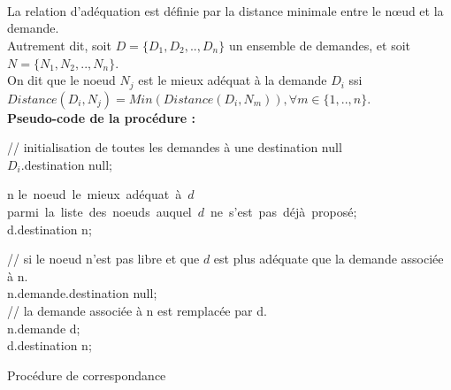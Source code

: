 \\ \\ \\
La relation d’adéquation est définie par la distance minimale entre le nœud et la demande.\\
Autrement dit, soit $D=\{D_1,D_2,..,D_n\}$ un ensemble de demandes, et soit $N=\{N_1,N_2,..,N_n\}$.\\
On dit que le noeud $N_j$ est le mieux adéquat à la demande $D_i$ ssi \\
$Distance(D_i,N_j) = Min (Distance(D_i,N_m)), \forall m \in \{1,..,n\}$.\\
\textbf{Pseudo-code de la procédure :}\\
\begin{algorithm}[H]
// initialisation de toutes les demandes à une destination null\\
{
 $D_i$.destination \gets null;\\
}
{
n \gets le\ noeud\ le\ mieux\ adéquat\ à\ $d$\\ parmi\ la\ liste\ des\ noeuds\ auquel\ $d$\ ne\ s'est\ pas\ déjà\ proposé;\\
{
  d.destination \gets n;\\
}
{
// si le noeud n’est pas libre et que $d$ est plus adéquate que la demande associée à n.\\
 { n.demande.destination \gets null;\\
   // la demande associée à n est remplacée par d.\\
   n.demande \gets d;\\
   d.destination \gets n;\\
 }
 
}
}
 \caption{Procédure de correspondance\\ \\}
\end{algorithm}
